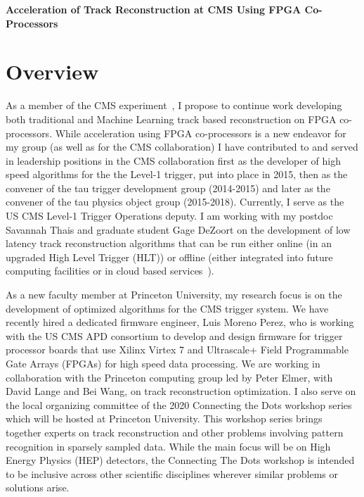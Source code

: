 \documentclass[preprint,12pt]{elsarticle}
\begin{document}





\noindent
\textbf{Acceleration of Track Reconstruction at CMS Using FPGA Co-Processors}

\section{Overview}
\label{S:1}
As a member of the CMS experiment~\cite{CMS-JINST}, I propose to continue work developing both
traditional and Machine Learning track based reconstruction on FPGA co-processors.
While acceleration using FPGA co-processors is a new endeavor for my group 
(as well as for the CMS collaboration) I have contributed to and served 
in leadership positions in the CMS collaboration first as the developer of
high speed algorithms for the the Level-1 trigger, put into place in 2015,
then as the convener of the tau trigger development group (2014-2015) 
and later as the convener of the tau physics object group (2015-2018).
Currently, I serve as the US CMS Level-1 Trigger Operations deputy.
I am working with my postdoc Savannah Thais and graduate student Gage DeZoort
on the development of low latency track reconstruction algorithms
that can be run either online (in an upgraded High Level Trigger (HLT)) or offline
(either integrated into future computing facilities or in cloud based services~\cite{Duarte_2019}). 

As a new faculty member at Princeton University, my research focus is 
on the development of optimized algorithms for the CMS trigger system.
We have recently hired a dedicated firmware engineer, Luis Moreno Perez,
who is working with the US CMS APD consortium to develop and design firmware
for trigger processor boards that use Xilinx Virtex 7 and Ultrascale+ 
Field Programmable Gate Arrays (FPGAs) for high speed data processing.
We are working in collaboration with the Princeton computing group led by Peter Elmer,
with David Lange and Bei Wang, on track reconstruction optimization. 
I also serve on the local organizing committee of the 2020 Connecting the Dots 
workshop series which will be hosted at Princeton University. This workshop
series brings together 
experts on track reconstruction and other problems involving pattern recognition 
in sparsely sampled data. While the main focus will be on High Energy Physics (HEP) 
detectors, the Connecting The Dots workshop is intended to be inclusive across other
scientific disciplines wherever similar problems or solutions arise. 
\end{document}
